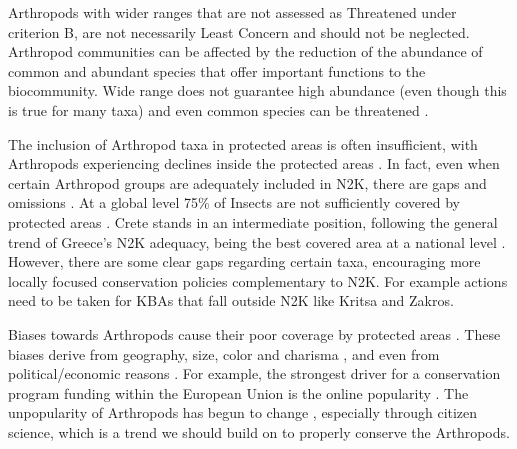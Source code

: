 Arthropods with wider ranges that are not assessed as Threatened under
criterion B, are not necessarily Least Concern and should not be neglected.
Arthropod communities can be affected by the reduction of the abundance of
common and abundant species that offer important functions to the biocommunity.
Wide range does not guarantee high abundance (even though this is true for many
taxa) and even common species can be threatened \parencite{habel2018vanishing,klink2023disproportionate}.

The inclusion of Arthropod taxa in protected areas is often insufficient, with
Arthropods experiencing declines inside the protected areas \parencite{borges2005ranking,chowdhury2023protected,harry2019protected,rada2019protected}.
In fact, even when certain Arthropod groups are adequately included in N2K,
there are gaps and omissions \parencite{sanchez-fernandez2008are-the-endemic,verovnik2011is-the-natura}.
At a global level 75\% of Insects are not sufficiently covered by protected
areas \parencite{chowdhury2023three-quarters}. Crete stands in an intermediate position,
following the general trend of Greece’s N2K adequacy, being the best covered
area at a national level \parencite{kougioumoutzis2021plant,spiliopoulou2021the-natura}.
However, there are some clear gaps regarding certain taxa, encouraging more
locally focused conservation policies complementary to N2K. For example actions
need to be taken for KBAs that fall outside N2K like Kritsa and Zakros.

Biases towards Arthropods cause their poor coverage by protected
areas \parencite{chowdhury2023protected,damen2013protected,delso2021protected}. These
biases derive from geography, size, color and charisma \parencite{cardoso2012habitats,mammola2020towards,wang2021out-of-sight},
and even from political/economic reasons \parencite{dias-silva2021protected}. For example,
the strongest driver for a conservation program funding within the European
Union is the online popularity \parencite{mammola2020towards}. The unpopularity of
Arthropods has begun to change \parencite{wagner2021insect}, especially through citizen
science, which is a trend we should build on to properly conserve the Arthropods.

